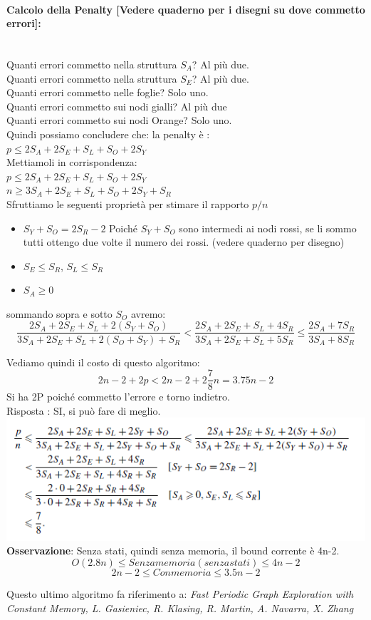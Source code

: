\paragraph{Calcolo della Penalty [Vedere quaderno per i disegni su dove commetto
            errori]:}\ \\
Quanti errori commetto nella struttura $S_A$? Al più due.\\
Quanti errori commetto nella struttura $S_E$? Al più due.\\
Quanti errori commetto nelle foglie? Solo uno.\\
Quanti errori commetto sui nodi gialli? Al più due\\
Quanti errori commetto sui nodi Orange? Solo uno.\\
Quindi possiamo concludere che: la penalty è : \\
$p \leq 2 S_A + 2 S_E + S_L + S_O + 2 S_Y$\\
Mettiamoli in corrispondenza: \\
$p \leq 2 S_A + 2 S_E + S_L + S_O + 2 S_Y$\\
$n \geq 3 S_A + 2 S_E + S_L + S_O + 2 S_Y + S_R$\\

Sfruttiamo le seguenti proprietà per stimare il rapporto $p/n$\\
\vspace{-10mm}
\begin{itemize}
    \item $S_Y + S_O = 2 S_R - 2$ Poiché $S_Y + S_O$ sono intermedi ai nodi rossi,
          se li sommo tutti ottengo due volte il numero dei rossi. (vedere quaderno per
          disegno)
    \item $S_E \leq S_R$, $S_L \leq S_R$
    \item $S_A \geq 0$
\end{itemize}
sommando sopra e sotto $S_O$ avremo: \\
$$\frac{2 S_A + 2 S_E + S_L + 2(S_Y + S_O)}{3 S_A + 2 S_E + S_L + 2(S_O + S_Y) +
        S_R} < \frac{2 S_A + 2 S_E + S_L + 4 S_R}{3 S_A + 2 S_E + S_L + 5 S_R} \leq
    \frac{2 S_A + 7 S_R}{3 S_A + 8 S_R} $$

Vediamo quindi il costo di questo algoritmo:\\
$$ 2n - 2 + 2p < 2n -2 + 2 \frac{7}{8} n = 3.75n -2 $$ Si ha 2P poiché commetto
l'errore e torno indietro.\\
Risposta : SI, si può fare di meglio.\\

\includegraphics[]{images/66.png}\\
\textbf{Osservazione}: Senza stati, quindi senza memoria, il bound corrente è
4n-2.\\
$$O(2.8n) \leq Senza memoria (senza stati) \leq 4n-2$$
$$2n-2 \leq Con memoria \leq 3.5n -2 $$

Questo ultimo algoritmo fa riferimento a: \emph{Fast Periodic Graph Exploration
    with Constant Memory, L. Gasieniec, R. Klasing, R. Martin, A. Navarra, X.
    Zhang}
